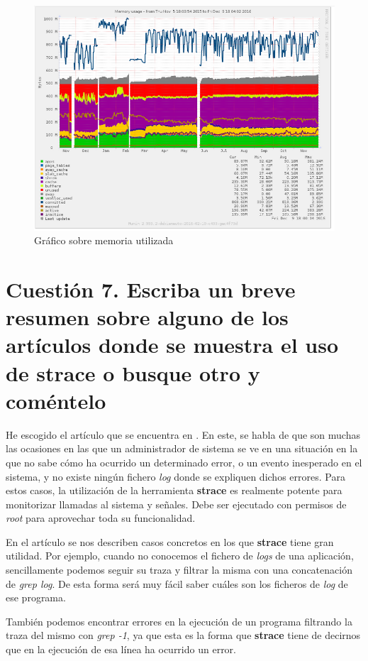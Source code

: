 \begin{figure}[H]
	\centering
	\includegraphics[scale=0.6]{cuestion6-memory.png}
	\caption{Gráfico sobre memoria utilizada} \label{cuestion6-memory}
\end{figure}

\section{Cuestión 7. Escriba un breve resumen sobre alguno de los artículos donde se muestra el uso de strace o busque otro y coméntelo}

He escogido el artículo que se encuentra en \cite{sysadmintips}.
En este, se habla de que son muchas las ocasiones en las que un administrador de sistema se ve en una situación en la que no sabe cómo ha ocurrido un determinado error, o un evento inesperado en el sistema, y no existe ningún fichero \textit{log} donde se expliquen dichos errores.
Para estos casos, la utilización de la herramienta \textbf{strace} es realmente potente para monitorizar llamadas al sistema y señales. Debe ser ejecutado con permisos de \textit{root} para aprovechar toda su funcionalidad.

En el artículo se nos describen casos concretos en los que \textbf{strace} tiene gran utilidad.
Por ejemplo, cuando no conocemos el fichero de \textit{logs} de una aplicación, sencillamente podemos seguir su traza y filtrar la misma con una concatenación de \textit{grep log}. De esta forma será muy fácil saber cuáles son los ficheros de \textit{log} de ese programa.

También podemos encontrar errores en la ejecución de un programa filtrando la traza del mismo con \textit{grep -1}, ya que esta es la forma que \textbf{strace} tiene de decirnos que en la ejecución de esa línea ha ocurrido un error.

